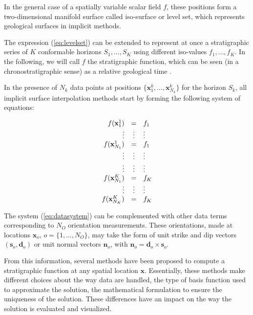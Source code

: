 \documentclass[final]{ring20}
\newcommand{\bx}{\mathbf{x}}
\newcommand{\bn}{\mathbf{n}}
\begin{document}
In the general case of a spatially variable scalar field $f$, these positions form a two-dimensional manifold surface called iso-surface or level set, which represents geological surfaces in implicit methods. 

The expression (\ref{eq:levelset}) can be extended to represent 
at once a stratigraphic series of $K$ conformable horizons 
$S_1, \ldots, S_K$ using different iso-values $f_1, \ldots, f_K$. 
In the following, we will call $f$ the stratigraphic function, which can be seen 
(in a chronostratigraphic sense) as a relative geological time \citep{Mallet2004MG,Lomask2006G,Wu2012G}.

In the presence of $N_k$ data points at positions $\{\mathbf{x}_1^k, \ldots, \mathbf{x}_{N_k}^k\}$ for the horizon $S_k$, all implicit surface interpolation methods start by forming the following system of equations: 

\begin{equation}
\label{eq:datasystem}
\begin{array}{r c l}
f(\bx_1^1) & = & f_1 \\
\vdots & \vdots & \vdots \\
f(\bx_{N_1}^1) & = & f_1 \\
\vdots & \vdots & \vdots \\
\vdots & \vdots & \vdots \\
f(\bx_{N_1}^K) & = & f_K \\
\vdots & \vdots & \vdots \\
f(\bx_{N_K}^K) & = & f_K \\
\end{array}
\end{equation}

The system (\ref{eq:datasystem}) can be complemented with other data terms corresponding to $N_O$ orientation measurements. These orientations, made at locations 
$\bx_o$, $o = \{1, \ldots, N_O\}$, may take the form of unit strike and dip vectors $(\mathbf{s}_o, \mathbf{d}_o)$ or unit normal vectors $\bn_o$, with $\mathbf{n}_o = \mathbf{d}_o \times \mathbf{s}_o$.  
 
From this information, several methods have been proposed to compute a stratigraphic function at any spatial location $\mathbf{x}$. Essentially, these methods make different choices about the way data are handled, the type of basis function used to approximate the solution, the mathematical formulation to ensure the uniqueness of the solution. These differences have an impact on the way the solution is evaluated and visualized. 
 
\end{document}
